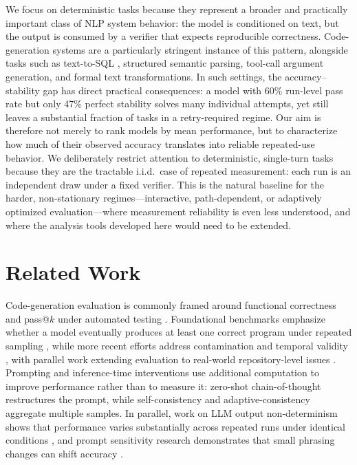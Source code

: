 \documentclass{article}
\begin{document}
We focus on deterministic tasks because they represent a broader and practically important class of NLP system behavior: the model is conditioned on text, but the output is consumed by a verifier that expects reproducible correctness. Code-generation systems are a particularly stringent instance of this pattern, alongside tasks such as text-to-SQL \citep{gao2023text}, structured semantic parsing, tool-call argument generation, and formal text transformations. In such settings, the accuracy--stability gap has direct practical consequences: a model with 60\% run-level pass rate but only 47\% perfect stability solves many individual attempts, yet still leaves a substantial fraction of tasks in a retry-required regime. Our aim is therefore not merely to rank models by mean performance, but to characterize how much of their observed accuracy translates into reliable repeated-use behavior. We deliberately restrict attention to deterministic, single-turn tasks because they are the tractable i.i.d.\ case of repeated measurement: each run is an independent draw under a fixed verifier. This is the natural baseline for the harder, non-stationary regimes---interactive, path-dependent, or adaptively optimized evaluation---where measurement reliability is even less understood, and where the analysis tools developed here would need to be extended.

\section{Related Work}
Code-generation evaluation is commonly framed around functional correctness and pass@$k$ under automated testing \citep{chen2021codex,austin2021program}. Foundational benchmarks emphasize whether a model eventually produces at least one correct program under repeated sampling \citep{chen2021codex,austin2021program,hendrycks2021apps}, while more recent efforts address contamination and temporal validity \citep{jain2024livecodebench}, with parallel work extending evaluation to real-world repository-level issues \citep{jimenez2024swebench}. Prompting and inference-time interventions use additional computation to improve performance rather than to measure it: zero-shot chain-of-thought \citep{kojima2022zeroshot} restructures the prompt, while self-consistency and adaptive-consistency \citep{wang2022self,aggarwal2023lets} aggregate multiple samples. In parallel, work on LLM output non-determinism shows that performance varies substantially across repeated runs under identical conditions \citep{atil2024llm,alvarado2025repetitions}, and prompt sensitivity research demonstrates that small phrasing changes can shift accuracy \citep{zhuo2024prosa}.
\end{document}
